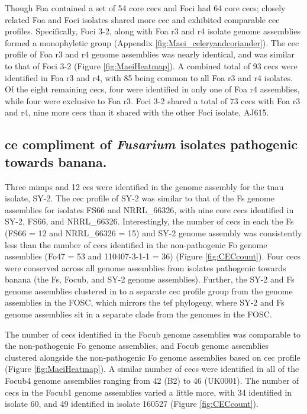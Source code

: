 Though \ac{Foa} contained a set of 54 core \acp{cec} and \ac{Foci} had 64 core \acp{cec}; closely related \ac{Foa} and \ac{Foci} isolates shared more \ac{cec} and exhibited comparable \ac{cec} profiles. Specifically, \ac{Foci} 3-2, along with \ac{Foa} \ac{r3} and \ac{r4} isolate genome assemblies formed a monophyletic group (Appendix \ref{fig:Maei_celeryandcoriander}). The \ac{cec} profile of \ac{Foa} \ac{r3} and \ac{r4} genome assemblies was nearly identical, and was similar to that of \ac{Foci} 3-2 (Figure \ref{fig:MaeiHeatmap}). A combined total of 93 \acp{cec} were identified in \ac{Foa} \ac{r3} and \ac{r4}, with 85 being common to all \ac{Foa} \ac{r3} and \ac{r4} isolates. Of the eight remaining \acp{cec}, four were identified in only one of \ac{Foa} \ac{r4} assemblies, while four were exclusive to \ac{Foa} \ac{r3}. \ac{Foci} 3-2 shared a total of 73 \acp{cec} with \ac{Foa} \ac{r3} and \ac{r4}, nine more \acp{cec} than it shared with the other \ac{Foci} isolate, AJ615. 


\subsection{\Acl{ce} compliment of \textit{Fusarium} isolates pathogenic towards banana.} 

 Three \acp{mimp} and 12 \acp{ce} were identified in the genome assembly for the \ac{tnau} isolate, SY-2. The \ac{cec} profile of SY-2 was similar to that of the \ac{Fs} genome assemblies for isolates FS66 and NRRL\_66326, with nine core \acp{cec} identified in SY-2, FS66, and NRRL\_66326.  Interestingly, the number of \acp{cec} in each the \ac{Fs} (FS66 = 12 and NRRL\_66326 = 15) and SY-2 genome assembly was consistently less than the number of \acp{cec} identified in the non-pathogenic \ac{Fo} genome assemblies (Fo47 = 53 and 110407-3-1-1 = 36) (Figure \ref{fig:CECcount}). Four \acp{cec} were conserved across all genome assemblies from isolates pathogenic towards banana (the \ac{Fs}, \ac{Focub}, and SY-2 genome assemblies). Further, the SY-2 and \ac{Fs} genome assemblies clustered in to a separate \ac{cec} profile group from the genome assemblies in the \ac{FOSC}, which mirrors the \ac{tef} phylogeny, where SY-2 and \ac{Fs} genome assemblies sit in a separate clade from the genomes in the \ac{FOSC}.

The number of \acp{cec} identified in the \ac{Focub} genome assemblies was comparable to the non-pathogenic \ac{Fo} genome assemblies, and \ac{Focub} genome assemblies clustered alongside the non-pathogenic \ac{Fo} genome assemblies based on \ac{cec} profile (Figure \ref{fig:MaeiHeatmap}). A similar number of \acp{cec} were identified in all of the \ac{Focub4} genome assemblies ranging from 42 (B2) to 46 (UK0001). The number of \acp{cec} in the \ac{Focub1} genome assemblies varied a little more, with 34 identified in isolate 60, and 49 identified in isolate 160527 (Figure \ref{fig:CECcount}). 

